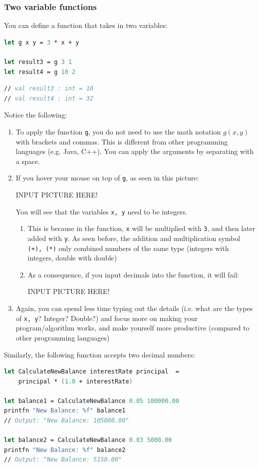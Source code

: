 \documentclass[12pt]{article}
\begin{document}
\subsubsection{Two variable functions}
You can define a function that takes in two variables:
\begin{lstlisting}[language=FSharp]
let g x y = 3 * x + y

let result3 = g 3 1
let result4 = g 10 2
\end{lstlisting}
\begin{lstlisting}[language=FSharp]
// val result3 : int = 10
// val result4 : int = 32
\end{lstlisting}
Notice the following:
\begin{enumerate}
\item To apply the function \texttt{g}, you do not need to use the math notation $g(x,y)$ with brackets and commas. This is different from other programming languages (e.g. Java, C++). You can apply the arguments by separating with a space.
\item If you hover your mouse on top of \texttt{g}, as seen in this picture:
\begin{center}
INPUT PICTURE HERE!
\end{center}
You will see that the variables \texttt{x, y} need to be integers.
\begin{enumerate}
\item This is because in the function, \texttt{x} will be multiplied with \texttt{3}, and then later added with \texttt{y}. As seen before, the addition and multiplication symbol \texttt{(+), (*)} only combined numbers of the same type (integers with integers, double with double)
\item As a consequence, if you input decimals into the function, it will fail:
\begin{center}
INPUT PICTURE HERE!
\end{center}
\end{enumerate}
\item Again, you can spend less time typing out the details (i.e. what are the types of \texttt{x, y}? Integer? Double?) and focus more on making your program/algorithm works, and make yourself more productive (compared to other programming languages)
\end{enumerate}

\pagebreak

Similarly, the following function accepts two decimal numbers:
\begin{lstlisting}[language=FSharp]
let CalculateNewBalance interestRate principal  = 
    principal * (1.0 + interestRate)

let balance1 = CalculateNewBalance 0.05 100000.00 
printfn "New Balance: %f" balance1
// Output: "New Balance: 105000.00"

let balance2 = CalculateNewBalance 0.03 5000.00 
printfn "New Balance: %f" balance2
// Output: "New Balance: 5150.00"
\end{lstlisting}
\end{document}
